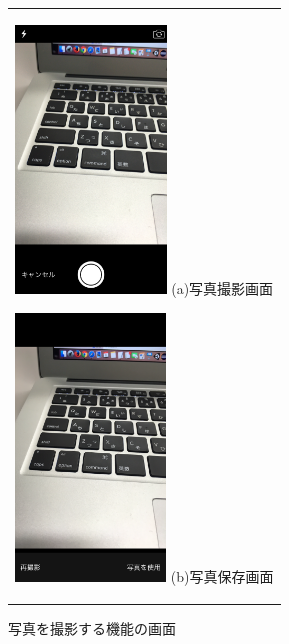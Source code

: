 \begin{figure}[htbp]
  \begin{center}
    \begin{tabular}{c}

      \begin{minipage}{0.33\hsize}
        \begin{center}
\includegraphics[width=4cm, bb=0 0 304 570]{kiko_takephoto1.PNG}
          \hspace{1cm} (a)写真撮影画面
        \end{center}
      \end{minipage}

      \begin{minipage}{0.33\hsize}
        \begin{center}
\includegraphics[width=4cm, bb=0 0 304 570]{kiko_takephoto2.PNG}
          \hspace{1cm} (b)写真保存画面
        \end{center}
      \end{minipage}
      
    \end{tabular}
    \caption{写真を撮影する機能の画面}
    \label{fig:lena}
  \end{center}
\end{figure}　　　　　　　　　　

